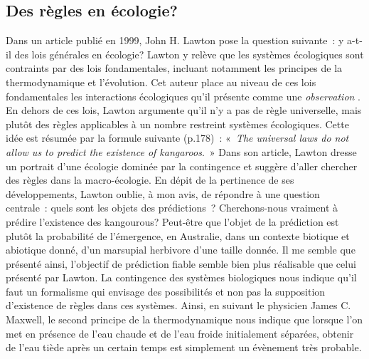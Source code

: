 \subsection*{Des règles en
écologie?}\label{des-ruxe8gles-en-uxe9cologie}

Dans un article publié en 1999, John H. Lawton pose la question
suivante~: y a-t-il des lois générales en écologie? Lawton y relève que
les systèmes écologiques sont contraints par des lois fondamentales,
incluant notamment les principes de la thermodynamique et l'évolution.
Cet auteur place au niveau de ces lois fondamentales les interactions
écologiques qu'il présente comme une \emph{observation} \citep[selon ces
mots,][]{Lawton1999}. En dehors de ces lois, Lawton argumente qu'il n'y
a pas de règle universelle, mais plutôt des règles applicables à un
nombre restreint systèmes écologiques. Cette idée est résumée par la
formule suivante (p.178)~: «~\emph{The universal laws do not allow us to
predict the existence of kangaroos}.~» Dans son article, Lawton dresse
un portrait d'une écologie dominée par la contingence et suggère d'aller
chercher des règles dans la macro-écologie. En dépit de la pertinence de
ses développements, Lawton oublie, à mon avis, de répondre à une
question centrale~: quels sont les objets des prédictions~?
Cherchons-nous vraiment à prédire l'existence des kangourous? Peut-être
que l'objet de la prédiction est plutôt la probabilité de l'émergence,
en Australie, dans un contexte biotique et abiotique donné, d'un
marsupial herbivore d'une taille donnée. Il me semble que présenté
ainsi, l'objectif de prédiction fiable semble bien plus réalisable que
celui présenté par Lawton. La contingence des systèmes biologiques nous
indique qu'il faut un formalisme qui envisage des possibilités et non
pas la supposition d'existence de règles dans ces systèmes. Ainsi, en
suivant le physicien James C. Maxwell, le second principe de la
thermodynamique nous indique que lorsque l'on met en présence de l'eau
chaude et de l'eau froide initialement séparées, obtenir de l'eau tiède
après un certain temps est simplement un évènement très probable.

